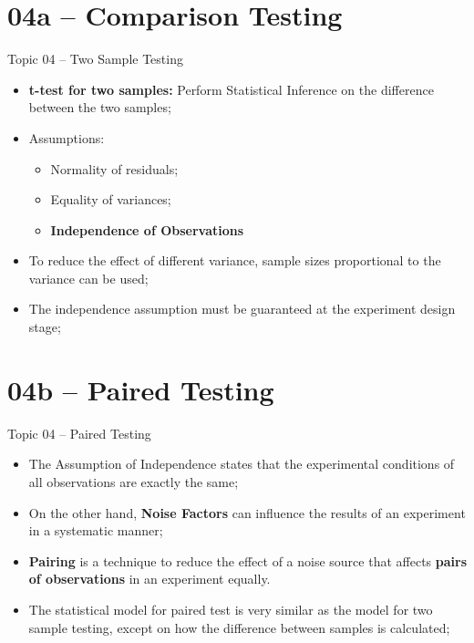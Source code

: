 \section{04a -- Comparison Testing}

\begin{frame}[t]{Topic 04 -- Two Sample Testing}
  \begin{itemize}
    \item {\bf t-test for two samples:} Perform Statistical Inference on the difference between the two samples;\bigskip

    \item Assumptions:
    \begin{itemize}
      \item Normality of residuals;
      \item Equality of variances;
      \item {\bf Independence of Observations}
    \end{itemize}\bigskip

    \item To reduce the effect of different variance, sample sizes proportional to the variance can be used;\bigskip

    \item The independence assumption must be guaranteed at the experiment design stage;
  \end{itemize}

\end{frame}

\section{04b -- Paired Testing}

\begin{frame}[t]{Topic 04 -- Paired Testing}
  \begin{itemize}
  \item The Assumption of Independence states that the experimental conditions of all observations are exactly the same;\bigskip

  \item On the other hand, {\bf Noise Factors} can influence the results of an experiment in a systematic manner;\bigskip

  \item {\bf Pairing} is a technique to reduce the effect of a noise source that affects {\bf pairs of observations} in an experiment equally.\bigskip

  \item The statistical model for paired test is very similar as the model for two sample testing, except on how the difference between samples is calculated;
  \end{itemize}

\end{frame}
